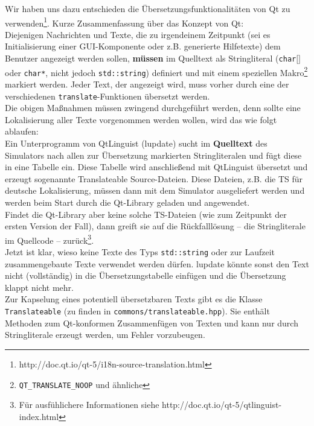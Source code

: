  Wir haben uns dazu entschieden die Übersetzungsfunktionalitäten von Qt zu verwenden\footnote{http://doc.qt.io/qt-5/i18n-source-translation.html}. Kurze Zusammenfassung über das Konzept von Qt:\\
 Diejenigen Nachrichten und Texte, die zu irgendeinem Zeitpunkt (sei es Initialisierung einer GUI-Komponente oder z.B. generierte Hilfetexte) dem Benutzer angezeigt werden sollen, \textbf{müssen} im Quelltext als Stringliteral (\texttt{char$\lbrack \rbrack$} oder \texttt{char*}, nicht jedoch \texttt{std::string}) definiert und mit einem speziellen Makro\footnote{\texttt{QT\_TRANSLATE\_NOOP} und ähnliche} markiert werden. Jeder Text, der angezeigt wird, muss vorher durch eine der verschiedenen \texttt{translate}-Funktionen übersetzt werden.\\
 Die obigen Maßnahmen müssen zwingend durchgeführt werden, denn sollte eine Lokalisierung aller Texte vorgenommen werden wollen, wird das wie folgt ablaufen:\\
 Ein Unterprogramm von QtLinguist (lupdate) sucht im \textbf{Quelltext} des Simulators nach allen zur Übersetzung markierten Stringliteralen und fügt diese in eine Tabelle ein. Diese Tabelle wird anschließend mit QtLinguist übersetzt und erzeugt sogenannte Translateable Source-Dateien. Diese Dateien, z.B. die TS für deutsche Lokalisierung, müssen dann mit dem Simulator ausgeliefert werden und werden beim Start durch die Qt-Library geladen und angewendet.\\
 Findet die Qt-Library aber keine solche TS-Dateien (wie zum Zeitpunkt der ersten Version der Fall), dann greift sie auf die Rückfalllösung -- die Stringliterale im Quellcode -- zurück\footnote{Für ausfühlichere Informationen siehe http://doc.qt.io/qt-5/qtlinguist-index.html}.\\
 
 Jetzt ist klar, wieso keine Texte des Typs \texttt{std::string} oder zur Laufzeit zusammengebaute Texte verwendet werden dürfen. lupdate könnte sonst den Text nicht (vollständig) in die Übersetzungstabelle einfügen und die Übersetzung klappt nicht mehr.\\
 
 Zur Kapselung eines potentiell übersetzbaren Texts gibt es die Klasse \texttt{Translateable} (zu finden in \texttt{commons/translateable.hpp}). Sie enthält Methoden zum Qt-konformen Zusammenfügen von Texten und kann nur durch Stringliterale erzeugt werden, um Fehler vorzubeugen.
